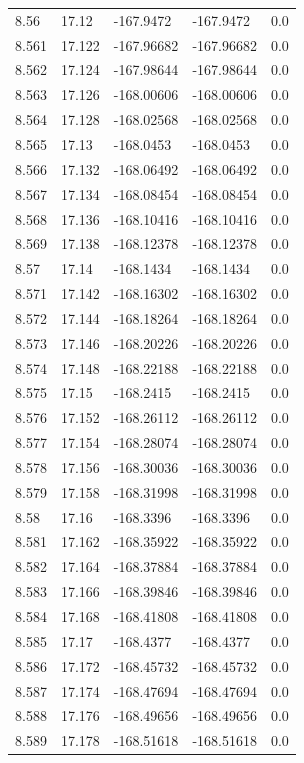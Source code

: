 \begin{tabular}{lllll}
8.56 & 17.12 & -167.9472 & -167.9472 & 0.0 \\
8.561 & 17.122 & -167.96682 & -167.96682 & 0.0 \\
8.562 & 17.124 & -167.98644 & -167.98644 & 0.0 \\
8.563 & 17.126 & -168.00606 & -168.00606 & 0.0 \\
8.564 & 17.128 & -168.02568 & -168.02568 & 0.0 \\
8.565 & 17.13 & -168.0453 & -168.0453 & 0.0 \\
8.566 & 17.132 & -168.06492 & -168.06492 & 0.0 \\
8.567 & 17.134 & -168.08454 & -168.08454 & 0.0 \\
8.568 & 17.136 & -168.10416 & -168.10416 & 0.0 \\
8.569 & 17.138 & -168.12378 & -168.12378 & 0.0 \\
8.57 & 17.14 & -168.1434 & -168.1434 & 0.0 \\
8.571 & 17.142 & -168.16302 & -168.16302 & 0.0 \\
8.572 & 17.144 & -168.18264 & -168.18264 & 0.0 \\
8.573 & 17.146 & -168.20226 & -168.20226 & 0.0 \\
8.574 & 17.148 & -168.22188 & -168.22188 & 0.0 \\
8.575 & 17.15 & -168.2415 & -168.2415 & 0.0 \\
8.576 & 17.152 & -168.26112 & -168.26112 & 0.0 \\
8.577 & 17.154 & -168.28074 & -168.28074 & 0.0 \\
8.578 & 17.156 & -168.30036 & -168.30036 & 0.0 \\
8.579 & 17.158 & -168.31998 & -168.31998 & 0.0 \\
8.58 & 17.16 & -168.3396 & -168.3396 & 0.0 \\
8.581 & 17.162 & -168.35922 & -168.35922 & 0.0 \\
8.582 & 17.164 & -168.37884 & -168.37884 & 0.0 \\
8.583 & 17.166 & -168.39846 & -168.39846 & 0.0 \\
8.584 & 17.168 & -168.41808 & -168.41808 & 0.0 \\
8.585 & 17.17 & -168.4377 & -168.4377 & 0.0 \\
8.586 & 17.172 & -168.45732 & -168.45732 & 0.0 \\
8.587 & 17.174 & -168.47694 & -168.47694 & 0.0 \\
8.588 & 17.176 & -168.49656 & -168.49656 & 0.0 \\
8.589 & 17.178 & -168.51618 & -168.51618 & 0.0 \\

\end{tabular}
